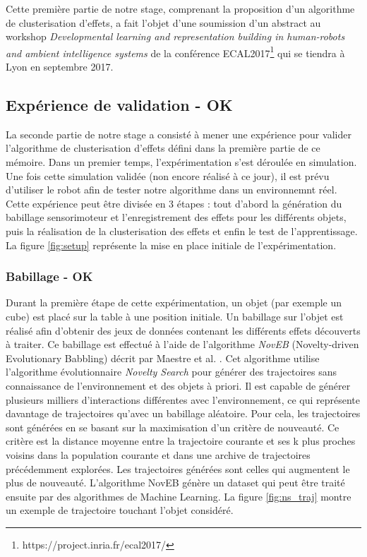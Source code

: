 \documentclass[draft]{llncs}
\begin{document}

Cette première partie de notre stage, comprenant la proposition d'un algorithme de clusterisation d'effets, a fait l'objet d'une soumission d'un abstract au workshop \textit{Developmental learning and representation building in human-robots and ambient intelligence systems} de la conférence ECAL2017\footnote{https://project.inria.fr/ecal2017/} qui se tiendra à Lyon en septembre 2017.






\subsection{Expérience de validation - OK}

La seconde partie de notre stage a consisté à mener une expérience pour valider l'algorithme de clusterisation d'effets défini dans la première partie de ce mémoire.
Dans un premier temps, l'expérimentation s'est déroulée en simulation.
Une fois cette simulation validée (non encore réalisé à ce jour), il est prévu d'utiliser le robot afin de tester notre algorithme dans un environnemnt réel.
Cette expérience peut être divisée en 3 étapes : tout d'abord la génération du babillage sensorimoteur et l'enregistrement des effets pour les différents objets, puis la réalisation de la clusterisation des effets et enfin le test de l'apprentissage.
La figure \ref{fig:setup} représente la mise en place initiale de l'expérimentation.



\subsubsection{Babillage - OK}

Durant la première étape de cette expérimentation, un objet (par exemple un cube) est placé sur la table à une position initiale.
Un babillage sur l'objet est réalisé afin d'obtenir des jeux de données contenant les différents effets découverts à traiter.
Ce babillage est effectué à l'aide de l'algorithme \textit{NovEB} (Novelty-driven Evolutionary Babbling) décrit par Maestre et al. \cite{Maestre2015}.
Cet algorithme utilise l'algorithme évolutionnaire \textit{Novelty Search} \cite{5949955} pour générer des trajectoires sans connaissance de l'environnement et des objets à priori. 
Il est capable de générer plusieurs milliers d'interactions différentes avec l'environnement, ce qui représente davantage de trajectoires qu'avec un babillage aléatoire.
Pour cela, les trajectoires sont générées en se basant sur la maximisation d'un critère de nouveauté.
Ce critère est la distance moyenne entre la trajectoire courante et ses k plus proches voisins dans la population courante et dans une archive de trajectoires précédemment explorées.
Les trajectoires générées sont celles qui augmentent le plus de nouveauté.
L'algorithme NovEB génère un dataset qui peut être traité ensuite par des algorithmes de Machine Learning.
La figure \ref{fig:ns_traj} montre un exemple de trajectoire touchant l'objet considéré.
\end{document}
